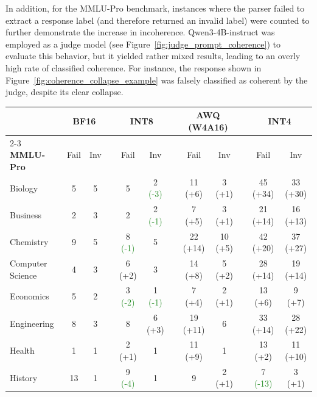 \documentclass{article}
\newcommand{\de}[1]{\textcolor{crimsonred}{#1}}   %
\newcommand{\imp}[1]{\textcolor{forestgreen}{#1}} %
\begin{document}
In addition, for the MMLU-Pro benchmark, instances where the parser failed to extract a response label
(and therefore returned an invalid label) were counted to further demonstrate the increase in incoherence. 
Qwen3-4B-instruct was employed as a judge model (see Figure~\ref{fig:judge_prompt_coherence}) to evaluate this behavior, but it yielded rather mixed results, leading to an overly high rate of classified coherence. For instance, the response shown in Figure~\ref{fig:coherence_collapse_example} was falsely classified as coherent by the judge, despite its clear collapse.
\begin{table}[htbp]
\centering
\label{tab:3gram_split}
\small
\setlength{\tabcolsep}{5pt}
\begin{tabular}{l cc c cc c cc c cc}
\toprule
 & \multicolumn{2}{c}{\textbf{BF16}} && \multicolumn{2}{c}{\textbf{INT8}} && \multicolumn{2}{c}{\textbf{AWQ (W4A16)}} && \multicolumn{2}{c}{\textbf{INT4}} \\
\cmidrule{2-3} \cmidrule{5-6} \cmidrule{8-9} \cmidrule{11-12}
\textbf{MMLU-Pro} & Fail & Inv && Fail & Inv && Fail & Inv && Fail & Inv \\
\midrule
Biology          & 5  & 5  && 5                            & 2 \imp{(-3)}  && 11 \de{(+6)}  & 3 \de{(+1)}    && 45 \de{(+34)} & 33 \de{(+30)} \\
Business         & 2  & 3  && 2                            & 2 \imp{(-1)}  && 7 \de{(+5)}   & 3 \de{(+1)}    && 21 \de{(+14)} & 16 \de{(+13)} \\
Chemistry        & 9  & 5  && 8 \imp{(-1)}  & 5                            && 22 \de{(+14)} & 10 \de{(+5)}   && 42 \de{(+20)} & 37 \de{(+27)} \\
Computer Science & 4  & 3  && 6 \de{(+2)}   & 3                            && 14 \de{(+8)}  & 5 \de{(+2)}    && 28 \de{(+14)} & 19 \de{(+14)} \\
Economics        & 5  & 2  && 3 \imp{(-2)}  & 1 \imp{(-1)}  && 7 \de{(+4)}   & 2 \de{(+1)}    && 13 \de{(+6)}  & 9 \de{(+7)}   \\
Engineering      & 8  & 3  && 8                            & 6 \de{(+3)}    && 19 \de{(+11)} & 6                            && 33 \de{(+14)} & 28 \de{(+22)} \\
Health           & 1  & 1  && 2 \de{(+1)}   & 1                            && 11 \de{(+9)}  & 1                            && 13 \de{(+2)}  & 11 \de{(+10)} \\
History          & 13 & 1  && 9 \imp{(-4)}  & 1                            && 9  & 2 \de{(+1)}    && 7 \imp{(-13)} & 3 \de{(+1)}   \\

\end{tabular}
\end{table}
\end{document}
